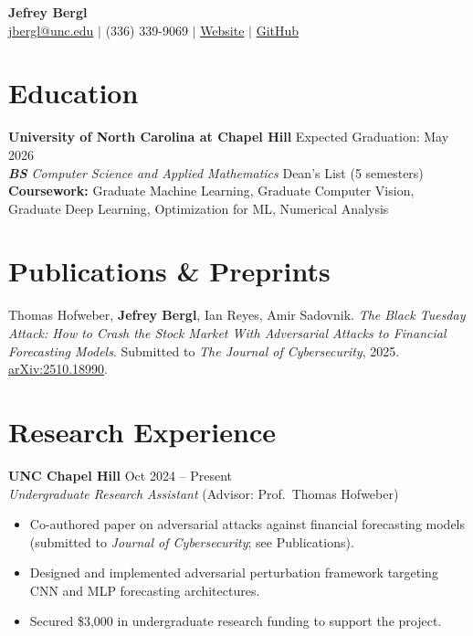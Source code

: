 \documentclass[11pt,letterpaper]{article}
\newcommand{\institution}[1]{\textbf{#1}}
\newcommand{\position}[1]{\textit{#1}}
\newcommand{\dates}[1]{\hfill #1}
\begin{document}
\begin{center}
    {\LARGE\textbf{Jefrey Bergl}} \\[3pt]
    \href{mailto:jbergl@unc.edu}{jbergl@unc.edu} $\mid$
    (336) 339-9069 $\mid$
    \href{https://jefreybergl.github.io/}{Website} $\mid$
    \href{https://github.com/jefreybergl}{GitHub}
\end{center}

\vspace{-8pt}

\section{Education}

\institution{University of North Carolina at Chapel Hill} \dates{Expected Graduation: May 2026} \\
\position{\textbf{BS} Computer Science and Applied Mathematics} \hfill Dean's List (5 semesters) \\
\textbf{Coursework:} Graduate Machine Learning, Graduate Computer Vision, Graduate Deep Learning, Optimization for ML, Numerical Analysis

\section{Publications \& Preprints}

Thomas Hofweber, \textbf{Jefrey Bergl}, Ian Reyes, Amir Sadovnik.
\textit{The Black Tuesday Attack: How to Crash the Stock Market With Adversarial Attacks to Financial Forecasting Models}.
Submitted to \textit{The Journal of Cybersecurity}, 2025.
\href{https://arxiv.org/abs/2510.18990}{arXiv:2510.18990}.

\section{Research Experience}

\institution{UNC Chapel Hill} \dates{Oct 2024 -- Present} \\
\position{Undergraduate Research Assistant} (Advisor: Prof.\ Thomas Hofweber) \\[-6pt]
\begin{itemize}
    \item Co-authored paper on adversarial attacks against financial forecasting models (submitted to \textit{Journal of Cybersecurity}; see Publications).
    \item Designed and implemented adversarial perturbation framework targeting CNN and MLP forecasting architectures.
    \item Secured \$3,000 in undergraduate research funding to support the project.
\end{itemize}
\end{document}
